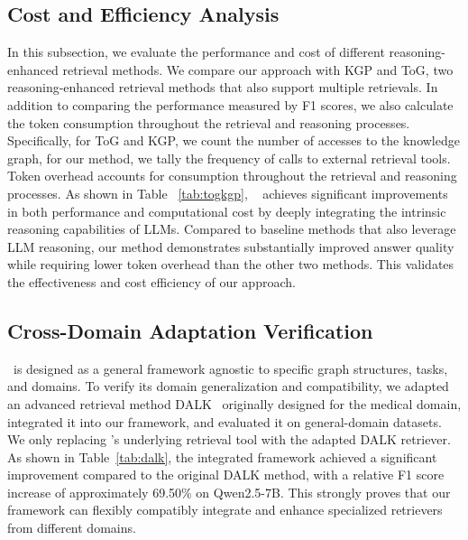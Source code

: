 \subsection{Cost and Efficiency Analysis}





In this subsection, we evaluate the performance and cost of different reasoning-enhanced retrieval methods. We compare our approach with KGP and ToG, two reasoning-enhanced retrieval methods that also support multiple retrievals. In addition to comparing the performance measured by F1 scores, we also calculate the token consumption throughout the retrieval and reasoning processes. Specifically, for ToG and KGP, we count the number of accesses to the knowledge graph, for our method, we tally the frequency of calls to external retrieval tools. Token overhead accounts for consumption throughout the retrieval and reasoning processes.
As shown in Table ~\ref{tab:togkgp}, \methodname~ achieves significant improvements in both performance and computational cost by deeply integrating the intrinsic reasoning capabilities of LLMs. Compared to baseline methods that also leverage LLM reasoning, our method demonstrates substantially improved answer quality while requiring lower token overhead than the other two methods. This validates the effectiveness and cost efficiency of our approach.





\subsection{Cross-Domain Adaptation Verification}

\methodname~is designed as a general framework agnostic to specific graph structures, tasks, and domains. To verify its domain generalization and compatibility, we adapted an advanced retrieval method DALK~\cite{li2024dalk} originally designed for the medical domain, integrated it into our framework, and evaluated it on general-domain datasets.
We only replacing \methodname's underlying retrieval tool with the adapted DALK retriever. As shown in Table~\ref{tab:dalk}, the integrated framework achieved a significant improvement compared to the original DALK method, with a relative F1 score increase of approximately 69.50\% on Qwen2.5-7B. This strongly proves that our framework can flexibly compatibly integrate and enhance specialized retrievers from different domains.






